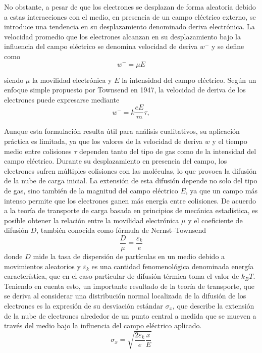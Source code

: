 \documentclass{article}
\begin{document}
\noindent No obstante, a pesar de que los electrones se desplazan de forma aleatoria debido a estas interacciones con el medio, en presencia de un campo eléctrico externo, se introduce una tendencia en su desplazamiento denominado deriva electrónica. La velocidad promedio que los electrones alcanzan en su desplazamiento bajo la influencia del campo eléctrico se denomina velocidad de deriva $w^{-}$ y se define como 
\begin{equation}
    w^{-} = \mu E
\end{equation}

\noindent siendo $\mu$ la movilidad electrónica y $E$ la intensidad del campo eléctrico. Según un enfoque simple propuesto por Townsend en 1947, la velocidad de deriva de los electrones puede expresarse mediante 
\begin{equation}
    w^{-}=k \frac{e E}{m} \tau,
\end{equation}

\noindent Aunque esta formulación resulta útil para análisis cualitativos, su aplicación práctica es limitada, ya que los valores de la velocidad de deriva $w$ y el tiempo medio entre colisiones $\tau$ dependen tanto del tipo de gas como de la intensidad del campo eléctrico. Durante su desplazamiento en presencia del campo, los electrones sufren múltiples colisiones con las moléculas, lo que provoca la difusión de la nube de carga inicial. La extensión de esta difusión depende no solo del tipo de gas, sino también de la magnitud del campo eléctrico $E$, ya que un campo más intenso permite que los electrones ganen más energía entre colisiones. De acuerdo a la teoría de transporte de carga basada en principios de mecánica estadística, es posible obtener la relación entre la movilidad electrónica $\mu$ y el coeficiente de difusión $D$, también conocida como fórmula de Nernst–Townsend
\begin{equation}
    \frac{D}{\mu}=\frac{\varepsilon_k}{e}
\end{equation}
\noindent donde $D$ mide la tasa de dispersión de partículas en un medio debido a movimientos aleatorios y $\varepsilon_k$ es una cantidad fenomenológica denominada energía característica, que en el caso particular de difusión térmica toma el valor de $k_{B} T$.\\

\noindent Teniendo en cuenta esto, un importante resultado de la teoría de transporte, que se deriva al considerar una distribución normal localizada de la difusión de los electrones es la expresión de su desviación estándar $\sigma_x$, que describe la extensión de la nube de electrones alrededor de un punto central a medida que se mueven a través del medio bajo la influencia del campo eléctrico aplicado.
\begin{equation}
    \sigma_x=\sqrt{\frac{2 \varepsilon_k}{e} \frac{x}{E}}
\end{equation}
\end{document}
